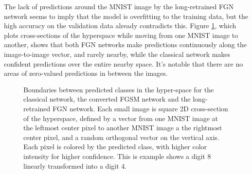\documentclass[12pt,oneside]{CUNY_PhD}
\begin{document}
The lack of predictions around the MNIST image by the long-retrained FGN network seems to imply that the model is overfitting to the training data, but the high accuracy on the validation data already contradicts this. Figure \ref{fig:fgsm-img2img}, which plots cross-sections of the hyperspace while moving from one MNIST image to another, shows that both FGN networks make predictions continuously along the image-to-image vector, and rarely nearby, while the classical network makes confident predictions over the entire nearby space. It's notable that there are no areas of zero-valued predictions in between the images. 
\begin{figure}[!h]
    \centering
    \caption{Boundaries between predicted classes in the hyper-space for the classical network, the converted FGSM network and the long-retrained FGN network. Each small image is square 2D cross-section of the hyperspace, defined by a vector from one MNIST image at the leftmost center pixel to another MNIST image a the rightmost center pixel, and a random orthogonal vector on the vertical axis. Each pixel is colored by the predicted class, with higher color intensity for higher confidence. This is example shows a digit 8 linearly transformed into a digit 4.}
    \label{fig:fgsm-img2img}
\end{figure}
\end{document}
